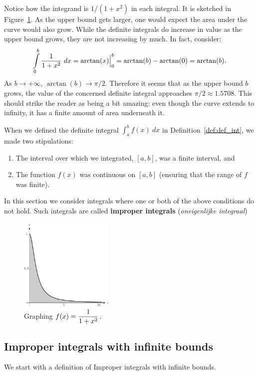 Notice how the integrand is $1/(1+x^2)$ in each integral. It is sketched in Figure~\ref{fig_int_14}. As the upper bound gets larger, one would expect the area under the curve would also grow. While the definite integrals do increase in value as the upper bound grows, they are not  increasing by much. In fact, consider:
$$\displaystyle \int\limits_0^b \frac{1}{1+x^2}\ dx = \arctan(x)\Big|_0^b = \arctan(b)-\arctan(0) = \arctan(b).$$
As $b\rightarrow +\infty$, $\arctan(b) \rightarrow \pi/2.$ Therefore it seems that as the upper bound $b$ grows, the value of the concerned definite integral  approaches $\pi/2\approx 1.5708$. This should strike the reader as being a bit amazing: even though the curve extends to infinity, it has a finite amount of area underneath it.





When we defined the definite integral $\int_a^b f(x)\ dx$ in Definition~\ref{def:def_int}, we made two stipulations:
	\begin{enumerate}
	\item		The interval over which we integrated, $[a,b]$, was a finite interval, and
	\item		The function $f(x)$ was continuous on $[a,b]$ (ensuring that the range of $f$ was finite).
	\end{enumerate}
	
In this section we consider integrals where one or both of the above conditions do not hold. Such integrals are called \textbf{improper integrals} (\textit{oneigenlijke integraal})


\begin{figure}[h]
	\begin{center}
			\includegraphics[width=0.4\textwidth]{fig_int_14}
	\caption{Graphing $\displaystyle f(x)=\frac{1}{1+x^2}$.}
	\label{fig_int_14}
	\end{center}
\end{figure}

\subsection{Improper integrals with infinite bounds}
We start with a definition of Improper integrals with infinite bounds. 

